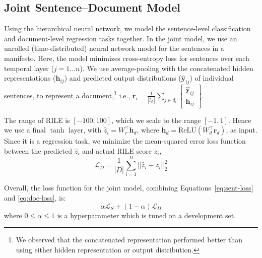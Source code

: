 \documentclass[11pt,a4paper]{article}
\newcommand{\eqnref}[2][]{Equation#1~\ref{#2}\xspace}
\begin{document}
\subsection{Joint Sentence--Document Model}
Using the hierarchical neural network, we model the sentence-level classification and document-level regression tasks together. In the joint model, we use an unrolled (time-distributed) neural network model for the sentences in a manifesto. Here, the model minimizes cross-entropy loss for sentences over each temporal layer ($j=1 \ldots n$). We use average-pooling with the concatenated hidden representations ($\mathbf{h}_{ij}$) and predicted output distributions ($\hat{\mathbf{y}}_{ij}$) of individual sentences, to represent a document,\footnote{We observed that the concatenated representation performed better than using either hidden representation or output distribution.} i.e.,
$ \mathbf{r}_i = \frac{1}{|l_{d_{i}}|}\sum_{j \in d_{i}} \left[\begin{array}{cc} \hat{\mathbf{y}}_{ij} \\ \mathbf{h}_{ij} \end{array} \right]  $.

The range of RILE is $[-100,100]$, which we scale to the range $[-1,1]$. Hence we use a final $\tanh$ layer, with $\hat{z}_i = W_{r}^\top \mathbf{h}_{d}$, where $\mathbf{h}_{d} = \text{ReLU}(W_{d}^\top \mathbf{r}_d)$, as input.
Since it is a regression task, we minimize the mean-squared error loss function between the predicted $\hat{z}_i$ and actual RILE score $z_i$,
\begin{equation}
\mathcal{L}_D = \frac{1}{|D|}  \sum_{i=1}^{D} ||\hat{z}_i - z_i||^2_2
\label{eq:doc-loss}
\end{equation}

Overall, the loss function for the joint model, combining \eqnref[s]{eq:sent-loss} and \ref{eq:doc-loss}, is:
\begin{equation}
 \alpha \mathcal{L}_S + (1-\alpha) \mathcal{L}_D
 \label{eq:joint-loss}
\end{equation}
where $0 \le \alpha \le 1$ is a hyperparameter which is tuned on a development set.
\end{document}
